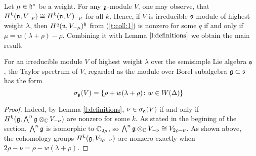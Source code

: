 Let $\mu \in \mathfrak{h}^*$ be a weight. For any $\mathfrak{g}$-module $V$, one may observe, that $H^k(\mathfrak{n},
V_{-\mu}) \cong H^k(\mathfrak{n}, V)_{-\mu}$ for all $k$. Hence, if $V$ is irreducible $\mathfrak{s}$-module of
highest weight $\lambda$, then $H^q(\mathfrak{n}, V_{-\mu})^{\mathfrak{h}}$ from (\ref{t:coll:1}) is nonzero for
some $q$ if and only if $\mu = w(\lambda + \rho) - \rho$. Combining it with Lemma
$\ref{l:definitions}$ we obtain the main result.
\begin{theorem} \label{t:borelspectrum}
   For an irreducible module $V$ of highest weight $\lambda$ over the semisimple Lie algebra
   $\mathfrak{s}$, the Taylor spectrum of $V$, regarded as the module over Borel subalgebra $\mathfrak{g} \subset
   \mathfrak{s}$ has the form 
   \[
       \sigma_{\mathfrak{g}}(V) = \{ \rho + w(\lambda + \rho)\colon w \in W(\Delta)\}
   \]
\end{theorem}
\begin{proof}
    Indeed, by Lemma \ref{l:definitions}, $\nu \in \sigma_{\mathfrak{g}}(V)$ if and only if $H^k(\mathfrak{g},
    \bigwedge^n\mathfrak{g} \otimes_{\mathbb{C}} V_{-\nu})$ are nonzero for some $k$. As stated in the begining of
    the section, $\bigwedge^n \mathfrak{g}$ is isomorphic to $\mathbb{C}_{2\rho}$, so $\bigwedge^n\mathfrak{g}
    \otimes_{\mathbb{C}} V_{-\nu} \cong V_{2\rho - \nu}$. As shown above, the cohomology groups $H^k(\mathfrak{g},
    V_{2\rho - \nu})$ are nonzero exactly when $2\rho - \nu = \rho - w(\lambda + \rho)$.
\end{proof}
